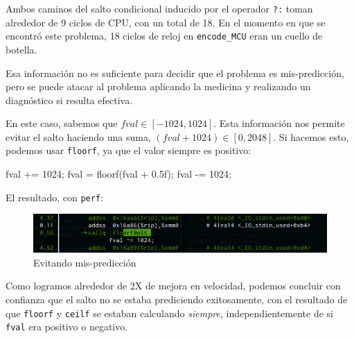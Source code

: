 Ambos caminos del salto condicional inducido por el operador \verb+?:+ toman
alrededor de 9 ciclos de CPU, con un total de 18. En el momento en que se
encontró este problema, 18 ciclos de reloj en \verb+encode_MCU+ eran un cuello
de botella.

Esa información no es suficiente para decidir que el problema es
mis-predicción, pero se puede atacar al problema aplicando la medicina y
realizando un diagnóstico si resulta efectiva.

En este caso, sabemos que $fval \in [-1024, 1024]$. Esta información nos
permite evitar el salto haciendo una suma, $(fval + 1024) \in [0, 2048]$. Si
hacemos esto, podemos usar \verb+floorf+, ya que el valor siempre es positivo:

\begin{code}[language=C][h]
    fval += 1024;
    fval = floorf(fval + 0.5f);
    fval -= 1024;
\end{code}

El resultado, con \verb+perf+:

\begin{figure}[hb]
    \includegraphics[width=5.16666in]{round_fast}
    \caption{Evitando mis-predicción}
\end{figure}

Como logramos alrededor de 2X de mejora en velocidad, podemos concluir con
confianza que el salto no se estaba prediciendo exitosamente, con el resultado
de que \verb+floorf+ y \verb+ceilf+ se estaban calculando \emph{siempre},
independientemente de si \verb+fval+ era positivo o negativo.



